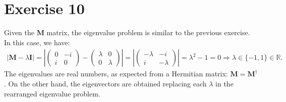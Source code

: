 \documentclass[letterpaper,11pt,twoside]{article}
\begin{document}
\section{Exercise 10}
Given the $\bm{M}$ matrix, the eigenvalue problem is similar to the previous exercise. In this case, we have:
\begin{align*}
  \left|\bm{M}-\lambda\bm{I}\right|=
  \left|\begin{pmatrix}
    0&-i\\i&0
  \end{pmatrix}-\begin{pmatrix}
    \lambda&0\\0&\lambda
  \end{pmatrix}\right|=\left|\begin{pmatrix}
    -\lambda&-i\\i&-\lambda
  \end{pmatrix}\right|=\lambda^2-1=0\Longrightarrow\lambda\in\{-1,1\}\in\mathbb{R}.
\end{align*}
The eigenvalues are real numbers, as expected from a Hermitian matrix: $\bm{M}=\bm{M}^\dagger$.
On the other hand, the eigenvectors are obtained replacing each $\lambda$ in the rearranged eigenvalue problem.
\end{document}
